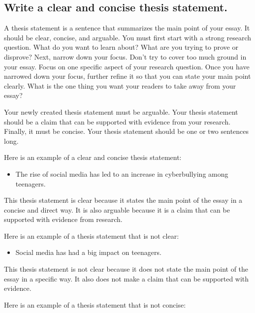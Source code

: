 \documentclass[
  b5paper]{book}
\providecommand{\tightlist}{%
  \setlength{\itemsep}{0pt}\setlength{\parskip}{0pt}}
\begin{document}
\hypertarget{write-a-clear-and-concise-thesis-statement.}{%
\subsection*{Write a clear and concise thesis statement.}\label{write-a-clear-and-concise-thesis-statement.}}

A thesis statement is a sentence that summarizes the main point of your essay. It should be clear, concise, and arguable. You must first start with a strong research question. What do you want to learn about? What are you trying to prove or disprove? Next, narrow down your focus. Don't try to cover too much ground in your essay. Focus on one specific aspect of your research question. Once you have narrowed down your focus, further refine it so that you can state your main point clearly. What is the one thing you want your readers to take away from your essay?

Your newly created thesis statement must be arguable. Your thesis statement should be a claim that can be supported with evidence from your research. Finally, it must be concise. Your thesis statement should be one or two sentences long.

Here is an example of a clear and concise thesis statement:

\begin{itemize}
\tightlist
\item
  The rise of social media has led to an increase in cyberbullying among teenagers.
\end{itemize}

This thesis statement is clear because it states the main point of the essay in a concise and direct way. It is also arguable because it is a claim that can be supported with evidence from research.

Here is an example of a thesis statement that is not clear:

\begin{itemize}
\tightlist
\item
  Social media has had a big impact on teenagers.
\end{itemize}

This thesis statement is not clear because it does not state the main point of the essay in a specific way. It also does not make a claim that can be supported with evidence.

Here is an example of a thesis statement that is not concise:
\end{document}
